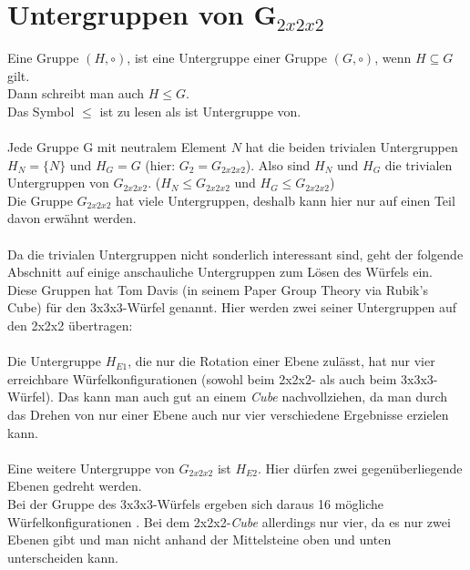 \documentclass[12pt,a4paper, usenames, dvipsnames]{article}
\begin{document}
\newpage

\section{Untergruppen von G$_{2x2x2}$}


Eine Gruppe $(H, \circ)$, ist eine Untergruppe einer Gruppe $(G, \circ)$, wenn $H \subseteq G$ gilt. \\
Dann schreibt man auch $H \leqslant G$. \\
Das Symbol $\leqslant$ ist zu lesen als \glqq ist Untergruppe von\grqq. \\
\\
Jede Gruppe G mit neutralem Element $N$ hat die beiden trivialen Untergruppen ${H_N = \{N\}}$ und $H_G=G$ (hier: $G_2=G_{2x2x2}$). Also sind $H_N$ und $H_G$ die trivialen Untergruppen von $G_{2x2x2}$. ($H_N \leqslant G_{2x2x2}$ und $H_G \leqslant G_{2x2x2}$)\\
Die Gruppe $G_{2x2x2}$ hat viele Untergruppen, deshalb kann hier nur auf einen Teil davon erwähnt werden. \\
\\
Da die trivialen Untergruppen nicht sonderlich interessant sind, geht der folgende Abschnitt auf einige anschauliche Untergruppen zum Lösen des Würfels ein. Diese Gruppen hat Tom Davis (in seinem Paper \glqq Group Theory via Rubik's Cube\grqq) \cite{TD} für den 3x3x3-Würfel genannt. Hier werden zwei seiner Untergruppen auf den 2x2x2 übertragen: \\ 
\\
Die Untergruppe $H_{E1}$, die nur die Rotation einer Ebene zulässt, hat nur vier erreichbare Würfelkonfigurationen (sowohl beim 2x2x2- als auch beim 3x3x3-Würfel). Das kann man auch gut an einem \textit{Cube} nachvollziehen, da man durch das Drehen von nur einer Ebene auch nur vier verschiedene Ergebnisse erzielen kann. \\
\\
Eine weitere Untergruppe von $G_{2x2x2}$ ist $H_{E2}$. Hier dürfen zwei gegenüberliegende Ebenen gedreht werden. \\
Bei der Gruppe des 3x3x3-Würfels ergeben sich daraus 16 mögliche Würfelkonfigurationen \cite{TD}. Bei dem 2x2x2-\textit{Cube} allerdings nur vier, da es nur zwei Ebenen gibt und man nicht anhand der Mittelsteine oben und unten unterscheiden kann. \\
\\
\end{document}
